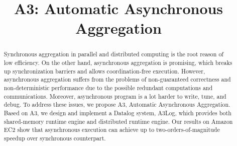 \documentclass[sigconf]{acmart}
\begin{document}
%
\title{A3: Automatic Asynchronous Aggregation}



%
\author{}




\begin{abstract}
Synchronous aggregation in parallel and distributed computing is the root reason of low efficiency. On the other hand, asynchronous aggregation is promising, which breaks up synchronization barriers and allows coordination-free execution. However, asynchronous aggregation suffers from the problems of non-guaranteed correctness and non-deterministic performance due to the possible redundant computations and communications. Moreover, asynchronous program is a lot harder to write, tune, and debug. To address these issues, we propose A3, Automatic Asynchronous Aggregation. Based on A3, we design and implement a Datalog system, A3Log, which provides both shared-memory runtime engine and distributed runtime engine. Our results on Amazon EC2 show that asynchronous execution can achieve up to two-orders-of-magnitude speedup over synchronous counterpart.
\end{abstract}


\maketitle

\newcommand{\Paragraph}[1]{\smallskip\noindent{\bf #1.}}
\end{document}
